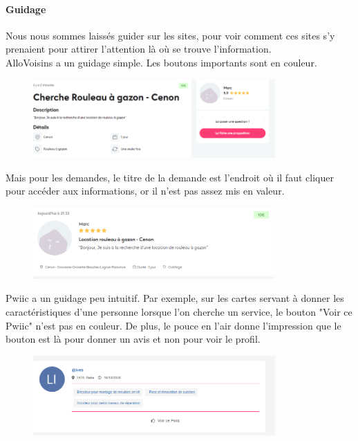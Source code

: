 \documentclass[a4paper,11pt]{article}
\begin{document}
\paragraph{Guidage}

Nous nous sommes laissés guider sur les sites, pour voir comment ces sites s’y prenaient pour attirer
l’attention là où se trouve l’information.\\

AlloVoisins a un guidage simple. Les boutons importants sont en couleur.\\

\begin{figure}[H]
  \includegraphics[width=350px]{images/Guidage-allovoisins.png}
  \label{fig:Guidage-allovoisins}
\end{figure}

Mais pour les demandes, le titre de la demande est l’endroit où il faut cliquer pour accéder aux informations,
or il n’est pas assez mis en valeur.\\

\begin{figure}[H]
  \includegraphics[width=350px]{images/demande-allovoisins.png}
  \label{fig:demande-allovoisins}
\end{figure}

Pwiic a un guidage peu intuitif. Par exemple, sur les cartes servant à donner les caractéristiques d’une personne
lorsque l’on cherche un service, le bouton "Voir ce Pwiic" n’est pas en couleur. De plus, le pouce en l’air donne
l’impression que le bouton est là pour donner un avis et non pour voir le profil.\\

\begin{figure}[H]
  \includegraphics[width=350px]{images/guidage-pwiic.png}
  \label{fig:guidage-pwiic}
\end{figure}
\end{document}
